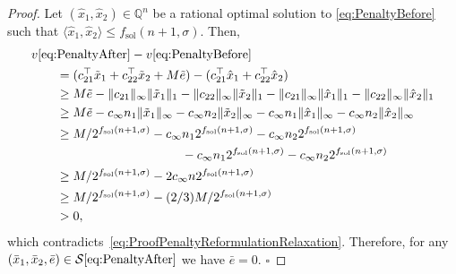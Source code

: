 \documentclass[runningheads,orivec]{llncs}
\newcommand{\MacroColor}[1]{#1}
\newcommand{\MyQED}{\mbox{}\hfill$\square$}
\newcommand{\SizeTwo}[2]{\langle#1,#2\rangle}
\newcommand{\NVariables}{\MacroColor{n}}
\newcommand{\OptValFunc}{\MacroColor{v}}
\newcommand{\OptSolSet}{\MacroColor{\mathcal{S}}}
\newcommand{\SolutionSizeEstimate}{\MacroColor{f_{\mathrm{sol}}}}
\newcommand{\ReformPen}{\MacroColor{e}}
\begin{document}
\begin{appendix}
\begin{proof}
Let $(\hat{x}_1, \hat{x}_2) \in \mathbb{Q}^{\NVariables}$ be a rational optimal solution to \eqref{eq:PenaltyBefore} such that $\SizeTwo{\hat{x}_1}{\hat{x}_2} \le \SolutionSizeEstimate(\NVariables + 1, \sigma)$.
Then,
\begin{align}
&
\OptValFunc\eqref{eq:PenaltyAfter}
-
\OptValFunc\eqref{eq:PenaltyBefore}
\notag
\\
&
\qquad
=
(c_{2 1}^{\top} \tilde{x}_1 + c_{2 2}^{\top} \tilde{x}_2 + M \tilde{\ReformPen})
-(c_{2 1}^{\top} \hat{x}_1 + c_{2 2}^{\top} \hat{x}_2)
\notag
\\
&
\qquad
\ge
M \tilde{\ReformPen} 
- \|c_{2 1} \|_\infty \| \tilde{x}_1 \|_1
- \|c_{2 2} \|_\infty \| \tilde{x}_2 \|_1
- \|c_{2 1} \|_\infty \| \hat{x}_1 \|_1
- \|c_{2 2} \|_\infty \| \hat{x}_2 \|_1
\notag
\\
&
\qquad
\ge
M \tilde{\ReformPen} 
- c_\infty \NVariables_1 \| \tilde{x}_1 \|_\infty
- c_\infty \NVariables_2 \| \tilde{x}_2 \|_\infty
- c_\infty \NVariables_1 \| \hat{x}_1 \|_\infty
- c_\infty \NVariables_2 \| \hat{x}_2 \|_\infty
\notag
\\
&
\qquad
\ge
M/2^{\SolutionSizeEstimate(\NVariables + 1, \sigma)}
- c_{\infty} \NVariables_1 2^{\SolutionSizeEstimate(\NVariables + 1, \sigma)}
- c_{\infty} \NVariables_2 2^{\SolutionSizeEstimate(\NVariables + 1, \sigma)}
\notag
\\
& 
\qquad
\qquad
\qquad
\qquad
\qquad
\qquad
-  c_{\infty} \NVariables_1 2^{\SolutionSizeEstimate(\NVariables + 1, \sigma)}
- c_{\infty} \NVariables_2 2^{\SolutionSizeEstimate(\NVariables + 1, \sigma)}
\notag
\\
&
\qquad
\ge
M/2^{\SolutionSizeEstimate(\NVariables + 1, \sigma)}
- 2 c_{\infty} \NVariables 2^{\SolutionSizeEstimate(\NVariables + 1, \sigma)}
\notag
\\
&
\qquad
\ge
M/2^{\SolutionSizeEstimate(\NVariables + 1, \sigma)}
- (2/3) M/2^{\SolutionSizeEstimate(\NVariables + 1, \sigma)}
\notag
\\
&
\qquad
> 0,
\notag
\end{align}
which contradicts~\eqref{eq:ProofPenaltyReformulationRelaxation}.
Therefore, for any $(\bar{x}_1, \bar{x}_2, \bar{\ReformPen}) \in \OptSolSet\eqref{eq:PenaltyAfter}$ we have $\bar{\ReformPen} = 0$.
\MyQED
\end{proof}


\end{appendix}
\end{document}

